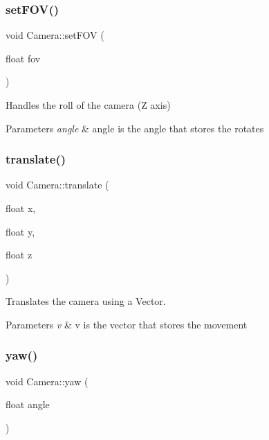 \subsubsection{\texorpdfstring{setFOV()}{setFOV()}}
{\footnotesize\ttfamily void Camera\+::set\+F\+OV (\begin{DoxyParamCaption}\item[{float}]{fov }\end{DoxyParamCaption})\hspace{0.3cm}{\ttfamily [inline]}}



Handles the roll of the camera (Z axis) 


\begin{DoxyParams}{Parameters}
{\em angle} & angle is the angle that stores the rotates \\
\hline
\end{DoxyParams}
\mbox{\label{class_camera_ac9e53556c53beee69c77a97e2a1c1068}} 
\subsubsection{\texorpdfstring{translate()}{translate()}}
{\footnotesize\ttfamily void Camera\+::translate (\begin{DoxyParamCaption}\item[{float}]{x,  }\item[{float}]{y,  }\item[{float}]{z }\end{DoxyParamCaption})\hspace{0.3cm}{\ttfamily [inline]}}



Translates the camera using a Vector. 


\begin{DoxyParams}{Parameters}
{\em v} & v is the vector that stores the movement \\
\hline
\end{DoxyParams}
\mbox{\label{class_camera_ab4eab94754431725c572d528a07a35cc}} 
\subsubsection{\texorpdfstring{yaw()}{yaw()}}
{\footnotesize\ttfamily void Camera\+::yaw (\begin{DoxyParamCaption}\item[{float}]{angle }\end{DoxyParamCaption})\hspace{0.3cm}{\ttfamily [inline]}}



